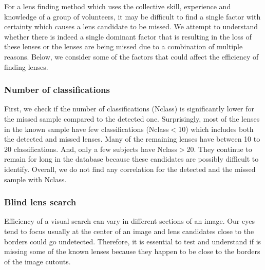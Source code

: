 \documentclass[useAMS,usenatbib,a4paper]{mn2e}
\begin{document}
For a lens finding method which uses the collective skill, experience and
knowledge of a group of volunteers, it may be difficult to find a single
factor with certainty which causes a lens candidate to be missed. We
attempt to understand whether there is indeed a single dominant factor
that is resulting in the loss of these lenses or the lenses are being
missed due to a combination of multiple reasons. Below, we consider some
of the factors that could affect the efficiency of finding lenses.

\subsubsection{Number of classifications}
First, we check if the number of classifications (Nclass) is
significantly lower for the missed sample compared to the detected one.
Surprisingly, most of the lenses in the known sample have few
classifications (Nclass$<$10) which includes both the detected and
missed lenses. Many of the remaining lenses have between 10 to 20
classifications. And, only a few subjects have Nclass$>$20. They
continue to remain for long in the database because these candidates are
possibly difficult to identify. Overall, we do not find any correlation
for the detected and the missed sample with Nclass.


\subsubsection{Blind lens search}
Efficiency of a visual search can vary in different sections of an
image. Our eyes tend to focus usually at the center of an image and lens
candidates close to the borders could go undetected. Therefore, it is
essential to test and understand if \sw is missing some of the known lenses
because they happen to be close to the borders of the image cutouts.
\end{document}
